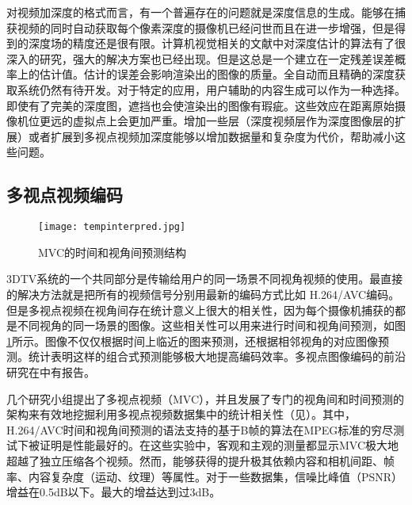 对视频加深度的格式而言，有一个普遍存在的问题就是深度信息的生成。能够在捕获视频的同时自动获取每个像素深度的摄像机已经问世而且在进一步增强，但是得到的深度场的精度还是很有限。计算机视觉相关的文献中对深度估计的算法有了很深入的研究，强大的解决方案也已经出现。但是这总是一个建立在一定残差误差概率上的估计值。估计的误差会影响渲染出的图像的质量。全自动而且精确的深度获取系统仍然有待开发。对于特定的应用，用户辅助的内容生成可以作为一种选择。即使有了完美的深度图，遮挡也会使渲染出的图像有瑕疵。这些效应在距离原始摄像机位更远的虚拟点上会更加严重。增加一些层（深度视频层作为深度图像层的扩展\cite{shade1998layered}）或者扩展到多视点视频加深度\cite{zitnick2004high, kauff2007depth}能够以增加数据量和复杂度为代价，帮助减小这些问题。

\subsection{多视点视频编码}

\begin{figure}[htbp]
\begin{center}
\texttt{[image: tempinterpred.jpg]}
\caption{MVC的时间和视角间预测结构}
\label{fig:tempinterpredchs}
\end{center}
\end{figure}

3DTV系统的一个共同部分是传输给用户的同一场景不同视角视频的使用。最直接的解决方法就是把所有的视频信号分别用最新的编码方式比如 H.264/AVC编码。但是多视点视频在视角间存在统计意义上很大的相关性，因为每个摄像机捕获的都是不同视角的同一场景的图像。这些相关性可以用来进行时间和视角间预测，如图\ref{fig:tempinterpredchs}所示。图像不仅仅根据时间上临近的图来预测，还根据相邻视角的对应图像预测。统计表明这样的组合式预测能够极大地提高编码效率\cite{merkle2005statistical, kaup2006analysis}。多视点图像编码的前沿研究在中有报告。

几个研究小组提出了多视点视频（MVC），并且发展了专门的视角间和时间预测的架构来有效地挖掘利用多视点视频数据集中的统计相关性（见）。其中，H.264/AVC时间和视角间预测的语法支持的基于B帧的算法\cite{schwarz2006analysis}在MPEG标准的穷尽测试下被证明是性能最好的\cite{flierl2007motion, merkle2006efficient, mueller2006multi, merkle2007efficient}。在这些实验中，客观和主观的测量都显示MVC极大地超越了独立压缩各个视频。然而，能够获得的提升极其依赖内容和相机间距、帧率、内容复杂度（运动、纹理）等属性。对于一些数据集，信噪比峰值（PSNR）增益在0.5dB以下。最大的增益达到过3dB。

